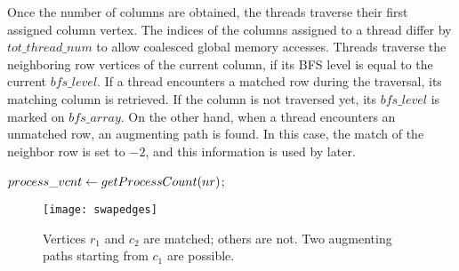 \documentclass[11pt,a4paper]{article}
\newcommand{\altswap}{{\sc{Alternate}}\xspace}
\begin{document}
 
 Once the number of columns are obtained, the threads traverse their 
 first assigned column vertex. The indices of the columns assigned to a thread 
 differ by $tot\_thread\_num$ to allow coalesced global memory accesses. 
 Threads traverse the neighboring row vertices of the current column, 
 if its BFS level is equal to the current $bfs\_level$. If a thread encounters
 a matched row during the traversal, its matching column is retrieved. 
 If the column is not traversed yet, its $bfs\_level$ is marked on $bfs\_array$. 
 On the other hand, when a thread encounters an unmatched row, 
 an augmenting path is found. In this case, the match of the neighbor 
 row is set to $-2$, and this information is used by \altswap later.

\begin{algorithm}
  \small 
  \caption{\altswap}
  \label{alg:kernelswap_edges}

	$process\_vcnt \gets {\sc getProcessCount} (nr)$;\\
\end{algorithm}

\begin{figure} [!htb]
\center
\texttt{[image: swapedges]}
\vspace*{-1ex}
\caption{Vertices $r_1$ and $c_2$ are matched; others are not.
Two augmenting paths starting from $c_1$ are possible.}

 \label{fig:swapedges}
\end{figure}
\end{document}
